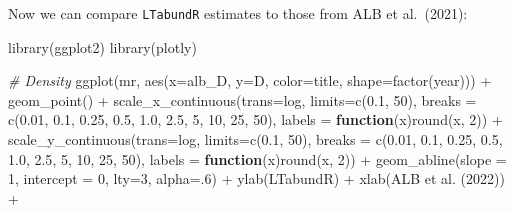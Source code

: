 \documentclass[
]{book}
\newenvironment{Shaded}{\begin{snugshade}}{\end{snugshade}}
\newcommand{\AttributeTok}[1]{\textcolor[rgb]{0.77,0.63,0.00}{#1}}
\newcommand{\CommentTok}[1]{\textcolor[rgb]{0.56,0.35,0.01}{\textit{#1}}}
\newcommand{\ControlFlowTok}[1]{\textcolor[rgb]{0.13,0.29,0.53}{\textbf{#1}}}
\newcommand{\DecValTok}[1]{\textcolor[rgb]{0.00,0.00,0.81}{#1}}
\newcommand{\FloatTok}[1]{\textcolor[rgb]{0.00,0.00,0.81}{#1}}
\newcommand{\FunctionTok}[1]{\textcolor[rgb]{0.00,0.00,0.00}{#1}}
\newcommand{\NormalTok}[1]{#1}
\newcommand{\SpecialCharTok}[1]{\textcolor[rgb]{0.00,0.00,0.00}{#1}}
\newcommand{\StringTok}[1]{\textcolor[rgb]{0.31,0.60,0.02}{#1}}
\begin{document}
Now we can compare \texttt{LTabundR} estimates to those from ALB et al.~(2021):

\begin{Shaded}
\begin{Highlighting}[]
\FunctionTok{library}\NormalTok{(ggplot2)}
\FunctionTok{library}\NormalTok{(plotly)}

\CommentTok{\# Density}
\FunctionTok{ggplot}\NormalTok{(mr,}
       \FunctionTok{aes}\NormalTok{(}\AttributeTok{x=}\NormalTok{alb\_D, }\AttributeTok{y=}\NormalTok{D, }\AttributeTok{color=}\NormalTok{title, }\AttributeTok{shape=}\FunctionTok{factor}\NormalTok{(year))) }\SpecialCharTok{+}
    \FunctionTok{geom\_point}\NormalTok{() }\SpecialCharTok{+}
    \FunctionTok{scale\_x\_continuous}\NormalTok{(}\AttributeTok{trans=}\StringTok{\textquotesingle{}log\textquotesingle{}}\NormalTok{, }\AttributeTok{limits=}\FunctionTok{c}\NormalTok{(}\FloatTok{0.1}\NormalTok{, }\DecValTok{50}\NormalTok{), }
                       \AttributeTok{breaks =} \FunctionTok{c}\NormalTok{(}\FloatTok{0.01}\NormalTok{, }\FloatTok{0.1}\NormalTok{, }\FloatTok{0.25}\NormalTok{, }\FloatTok{0.5}\NormalTok{, }\FloatTok{1.0}\NormalTok{, }\FloatTok{2.5}\NormalTok{, }\DecValTok{5}\NormalTok{, }\DecValTok{10}\NormalTok{, }\DecValTok{25}\NormalTok{, }\DecValTok{50}\NormalTok{),}
                       \AttributeTok{labels =} \ControlFlowTok{function}\NormalTok{(x)}\FunctionTok{round}\NormalTok{(x, }\DecValTok{2}\NormalTok{)) }\SpecialCharTok{+}
    \FunctionTok{scale\_y\_continuous}\NormalTok{(}\AttributeTok{trans=}\StringTok{\textquotesingle{}log\textquotesingle{}}\NormalTok{, }\AttributeTok{limits=}\FunctionTok{c}\NormalTok{(}\FloatTok{0.1}\NormalTok{, }\DecValTok{50}\NormalTok{), }
                       \AttributeTok{breaks =} \FunctionTok{c}\NormalTok{(}\FloatTok{0.01}\NormalTok{, }\FloatTok{0.1}\NormalTok{, }\FloatTok{0.25}\NormalTok{, }\FloatTok{0.5}\NormalTok{, }\FloatTok{1.0}\NormalTok{, }\FloatTok{2.5}\NormalTok{, }\DecValTok{5}\NormalTok{, }\DecValTok{10}\NormalTok{, }\DecValTok{25}\NormalTok{, }\DecValTok{50}\NormalTok{),}
                       \AttributeTok{labels =} \ControlFlowTok{function}\NormalTok{(x)}\FunctionTok{round}\NormalTok{(x, }\DecValTok{2}\NormalTok{)) }\SpecialCharTok{+}
    \FunctionTok{geom\_abline}\NormalTok{(}\AttributeTok{slope =} \DecValTok{1}\NormalTok{, }\AttributeTok{intercept =} \DecValTok{0}\NormalTok{, }\AttributeTok{lty=}\DecValTok{3}\NormalTok{, }\AttributeTok{alpha=}\NormalTok{.}\DecValTok{6}\NormalTok{) }\SpecialCharTok{+}
    \FunctionTok{ylab}\NormalTok{(}\StringTok{\textquotesingle{}LTabundR\textquotesingle{}}\NormalTok{) }\SpecialCharTok{+} \FunctionTok{xlab}\NormalTok{(}\StringTok{\textquotesingle{}ALB et al. (2022)\textquotesingle{}}\NormalTok{) }\SpecialCharTok{+}

\end{Highlighting}
\end{Shaded}
\end{document}
